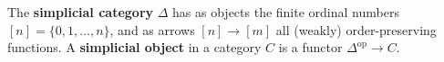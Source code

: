 The \textbf{simplicial category} $\Delta$ has as objects the finite ordinal numbers $[n] = \{0, 1, \ldots, n\}$, and as arrows $[n] \rightarrow [m]$ all (weakly) order-preserving functions. A \textbf{simplicial object} in a category $C$ is a functor $\Delta^{\text{op}} \rightarrow C$.